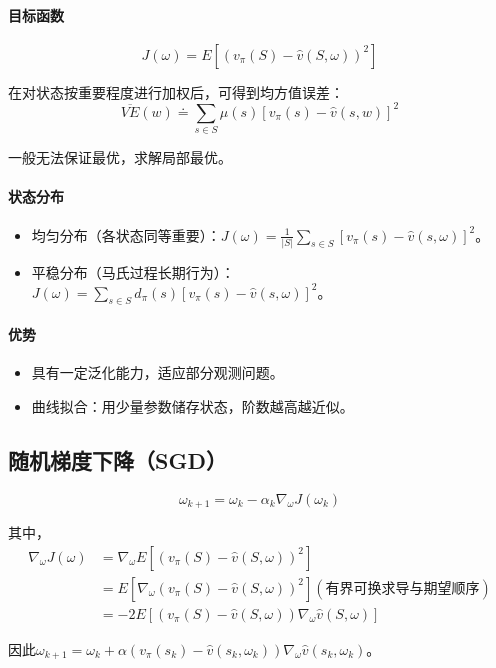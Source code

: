 \documentclass[
12pt, %
a4paper, 
oneside, %
headinclude,footinclude, %
]{scrartcl}
\begin{document}
\paragraph{目标函数}
$$ J(\omega) = E[(v_{\pi}(S) - \hat{v}(S, \omega))^2] $$

在对状态按重要程度进行加权后，可得到均方值误差：
$$ \overline{VE} (w) \doteq \sum_{s \in S} \mu(s) [v_\pi(s) - \hat{v}(s, w)]^2 $$

一般无法保证最优，求解局部最优。
\paragraph{状态分布}
\begin{itemize}
\item 均匀分布（各状态同等重要）：$ J(\omega) = \frac{1}{|S|}\sum_{s \in S}[v_{\pi}(s) - \hat{v}(s, \omega)]^2 $。
\item 平稳分布（马氏过程长期行为）：$ J(\omega) = \sum_{s \in S}d_{\pi}(s)[v_{\pi}(s) - \hat{v}(s, \omega)]^2 $。
\end{itemize}
\paragraph{优势}
\begin{itemize}
\item 具有一定泛化能力，适应部分观测问题。
\item 曲线拟合：用少量参数储存状态，阶数越高越近似。
\end{itemize}
\subsection[随机梯度下降]{随机梯度下降（SGD）}
$$ \omega_{k + 1} = \omega_k - \alpha_k \nabla_\omega J(\omega_k) $$

其中，
\begin{align*}
\nabla_\omega J(\omega)
&= \nabla_\omega E[(v_\pi(S) - \hat{v}(S, \omega))^2] \\
&= E[\nabla_\omega (v_\pi(S) - \hat{v}(S, \omega))^2] (\text{有界可换求导与期望顺序}) \\
&= -2E[(v_\pi(S) - \hat{v}(S, \omega)) \nabla_\omega \hat{v}(S, \omega)]
\end{align*}

因此$ \omega_{k + 1} = \omega_k + \alpha (v_\pi(s_k) - \hat{v}(s_k, \omega_k)) \nabla_\omega \hat{v}(s_k, \omega_k) $。
\end{document}
